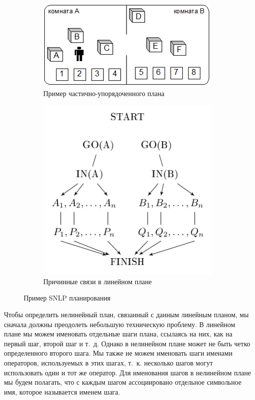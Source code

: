 \documentclass[b5paper,11pt]{book}
\numberwithin{Def}{section}
\numberwithin{Th}{chapter}
\numberwithin{St}{chapter}
\begin{document}
	\begin{figure}[h]
		\centering
		\begin{subfigure}[b]{0.45\textwidth}
			\includegraphics[width=\textwidth]{snlp_example.png}
			\caption{Пример частично-упорядоченного плана}
			\label{fig:snlp_example}
		\end{subfigure}
		\hfill
		\begin{subfigure}[b]{0.45\textwidth}
			\includegraphics[width=\textwidth]{snlp}
			\caption {Причинные связи в линейном плане}
		\end{subfigure}
		\caption{Пример SNLP планирования}
		\label{fig:snlp_causal}
	\end{figure}
	
	Чтобы определить нелинейный план, связанный с данным линейным планом, мы сначала
	должны преодолеть небольшую техническую проблему. В линейном плане мы можем
	именовать отдельные шаги плана, ссылаясь на них, как на первый шаг, второй шаг и т.~д. Однако в нелинейном плане может не быть четко определенного второго шага. Мы также не можем именовать шаги именами операторов, используемых в этих шагах, т.~к. несколько шагов	могут использовать один и тот же оператор. Для именования шагов в нелинейном плане мы	будем полагать, что с каждым шагом ассоциировано отдельное символьное имя, которое	называется именем шага.
	
\end{document}
